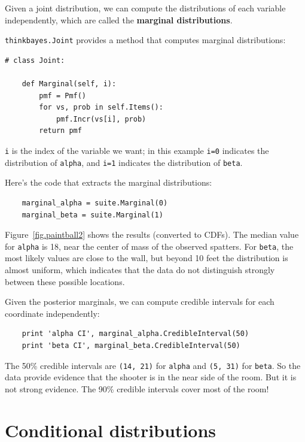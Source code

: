 \documentclass[12pt]{book}
\begin{document}
Given a joint distribution, we can compute the distributions
of each variable independently, which are called the {\bf marginal
distributions}.

{\tt thinkbayes.Joint} provides a method that computes marginal
distributions:

\begin{verbatim}
# class Joint:

    def Marginal(self, i):
        pmf = Pmf()
        for vs, prob in self.Items():
            pmf.Incr(vs[i], prob)
        return pmf
\end{verbatim}

{\tt i} is the index of the variable we want; in this example
{\tt i=0} indicates the distribution of {\tt alpha}, and
{\tt i=1} indicates the distribution of {\tt beta}.

Here's the code that extracts the marginal distributions:

\begin{verbatim}
    marginal_alpha = suite.Marginal(0)
    marginal_beta = suite.Marginal(1)
\end{verbatim}

Figure~\ref{fig.paintball2} shows the results (converted to CDFs).
The median value for {\tt alpha} is 18, near the center of mass of
the observed spatters.  For {\tt beta}, the most likely values are
close to the wall, but beyond 10 feet the distribution is almost
uniform, which indicates that the data do not distinguish strongly
between these possible locations.

Given the posterior marginals, we can compute credible intervals
for each coordinate independently:

\begin{verbatim}
    print 'alpha CI', marginal_alpha.CredibleInterval(50)
    print 'beta CI', marginal_beta.CredibleInterval(50)
\end{verbatim}

The 50\% credible intervals are {\tt (14, 21)} for {\tt alpha} and
{\tt (5, 31)} for {\tt beta}.  So the data provide evidence that the
shooter is in the near side of the room.  But it is not strong
evidence.  The 90\% credible intervals cover most of the room!


\section{Conditional distributions}
\label{conditional}
\end{document}
